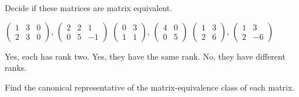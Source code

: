 \begin{exercises}
  \recommended \item 
    Decide if these matrices are matrix equivalent.
    \begin{exparts}
      \partsitem \( \begin{pmatrix}
                 1  &3  &0  \\
                 2  &3  &0
               \end{pmatrix} \),
            \( \begin{pmatrix}
                 2  &2  &1  \\
                 0  &5  &-1
               \end{pmatrix} \)
      \partsitem \( \begin{pmatrix}
                 0  &3  \\
                 1  &1
               \end{pmatrix} \),
            \( \begin{pmatrix}
                 4  &0  \\
                 0  &5
               \end{pmatrix} \)
      \partsitem \( \begin{pmatrix}
                 1  &3  \\
                 2  &6
               \end{pmatrix} \),
            \( \begin{pmatrix}
                 1  &3  \\
                 2  &-6
               \end{pmatrix} \)
    \end{exparts}
    \begin{answer}
      \begin{exparts}
        \partsitem Yes, each has rank two.
        \partsitem Yes, they have the same rank.
        \partsitem No, they have different ranks.
      \end{exparts}  
    \end{answer}
  \recommended \item
    Find the canonical representative of the matrix-equivalence class of
    each matrix.
\end{exercises}

